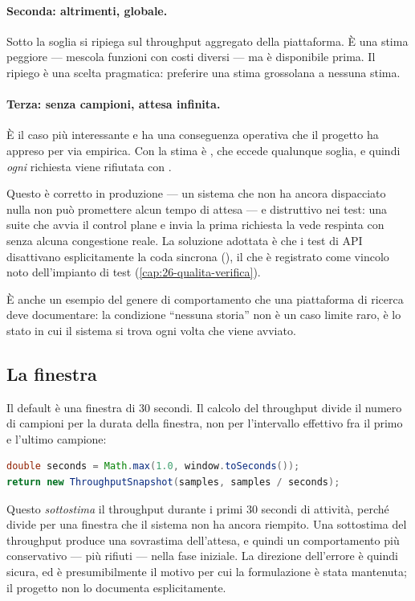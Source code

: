 \paragraph{Seconda: altrimenti, globale.} Sotto la soglia si ripiega sul
throughput aggregato della piattaforma. \`E una stima peggiore --- mescola
funzioni con costi diversi --- ma \`e disponibile prima. Il ripiego \`e una
scelta pragmatica: preferire una stima grossolana a nessuna stima.

\paragraph{Terza: senza campioni, attesa infinita.} \`E il caso pi\`u
interessante e ha una conseguenza operativa che il progetto ha appreso per via
empirica. Con  la stima \`e
, che eccede qualunque soglia, e quindi
\emph{ogni} richiesta viene rifiutata con .

Questo \`e corretto in produzione --- un sistema che non ha ancora dispacciato
nulla non pu\`o promettere alcun tempo di attesa --- e distruttivo nei test: una
suite che avvia il control plane e invia la prima richiesta la vede respinta con
 senza alcuna congestione reale. La soluzione adottata \`e che i test
di API disattivano esplicitamente la coda sincrona
(), il che \`e registrato come vincolo noto
dell'impianto di test (\cref{cap:26-qualita-verifica}).

\`E anche un esempio del genere di comportamento che una piattaforma di ricerca
deve documentare: la condizione ``nessuna storia'' non \`e un caso limite raro,
\`e lo stato in cui il sistema si trova ogni volta che viene avviato.

\subsection{La finestra}

Il default \`e una finestra di 30 secondi. Il calcolo del throughput divide il
numero di campioni per la durata della finestra, non per l'intervallo effettivo
fra il primo e l'ultimo campione:

\begin{lstlisting}[language=Java]
double seconds = Math.max(1.0, window.toSeconds());
return new ThroughputSnapshot(samples, samples / seconds);
\end{lstlisting}

Questo \emph{sottostima} il throughput durante i primi 30 secondi di attivit\`a,
perch\'e divide per una finestra che il sistema non ha ancora riempito. Una
sottostima del throughput produce una sovrastima dell'attesa, e quindi un
comportamento pi\`u conservativo --- pi\`u rifiuti --- nella fase iniziale. La
direzione dell'errore \`e quindi sicura, ed \`e presumibilmente il motivo per cui
la formulazione \`e stata mantenuta; il progetto non lo documenta esplicitamente.

